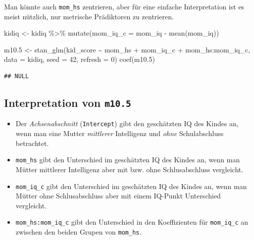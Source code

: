 \documentclass[
  a4paper,
  DIV=11]{scrreprt}
\newenvironment{Shaded}{\begin{snugshade}}{\end{snugshade}}
\newcommand{\AttributeTok}[1]{\textcolor[rgb]{0.40,0.45,0.13}{#1}}
\newcommand{\DecValTok}[1]{\textcolor[rgb]{0.68,0.00,0.00}{#1}}
\newcommand{\FloatTok}[1]{\textcolor[rgb]{0.68,0.00,0.00}{#1}}
\newcommand{\FunctionTok}[1]{\textcolor[rgb]{0.28,0.35,0.67}{#1}}
\newcommand{\NormalTok}[1]{\textcolor[rgb]{0.00,0.23,0.31}{#1}}
\newcommand{\OtherTok}[1]{\textcolor[rgb]{0.00,0.23,0.31}{#1}}
\newcommand{\SpecialCharTok}[1]{\textcolor[rgb]{0.37,0.37,0.37}{#1}}
\providecommand{\tightlist}{%
  \setlength{\itemsep}{0pt}\setlength{\parskip}{0pt}}\usepackage{longtable,booktabs,array}
\theoremstyle{definition}
\theoremstyle{remark}
\begin{document}
Man könnte auch \texttt{mom\_hs} zentrieren, aber für eine einfache
Interpretation ist es meist nützlich, nur metrische Prädiktoren zu
zentrieren.

\begin{Shaded}
\begin{Highlighting}[]
\NormalTok{kidiq }\OtherTok{\textless{}{-}}
\NormalTok{  kidiq }\SpecialCharTok{\%\textgreater{}\%} 
  \FunctionTok{mutate}\NormalTok{(}\AttributeTok{mom\_iq\_c =}\NormalTok{ mom\_iq }\SpecialCharTok{{-}} \FunctionTok{mean}\NormalTok{(mom\_iq))}

\NormalTok{m10}\FloatTok{.5} \OtherTok{\textless{}{-}} \FunctionTok{stan\_glm}\NormalTok{(kid\_score }\SpecialCharTok{\textasciitilde{}}\NormalTok{ mom\_hs }\SpecialCharTok{+}\NormalTok{ mom\_iq\_c }\SpecialCharTok{+}\NormalTok{ mom\_hs}\SpecialCharTok{:}\NormalTok{mom\_iq\_c, }
                  \AttributeTok{data =}\NormalTok{ kidiq, }
                  \AttributeTok{seed =} \DecValTok{42}\NormalTok{,}
                  \AttributeTok{refresh =} \DecValTok{0}\NormalTok{)}
\FunctionTok{coef}\NormalTok{(m10}\FloatTok{.5}\NormalTok{)}
\end{Highlighting}
\end{Shaded}

\begin{verbatim}
## NULL
\end{verbatim}

\hypertarget{interpretation-von-m10.5}{%
\subsection{\texorpdfstring{Interpretation von
\texttt{m10.5}}{Interpretation von m10.5}}\label{interpretation-von-m10.5}}

\begin{itemize}
\tightlist
\item
  Der \emph{Achsenabschnitt} (\texttt{Intercept}) gibt den geschätzten
  IQ des Kindes an, wenn man eine Mutter \emph{mittlerer} Intelligenz
  und \emph{ohne} Schulabschluss betrachtet.
\item
  \texttt{mom\_hs} gibt den Unterschied im geschätzten IQ des Kindes an,
  wenn man Mütter mittlerer Intelligenz aber mit bzw. ohne
  Schlusabschluss vergleicht.
\item
  \texttt{mom\_iq\_c} gibt den Unterschied im geschätzten IQ des Kindes
  an, wenn man Mütter ohne Schlusabschluss aber mit einem IQ-Punkt
  Unterschied vergleicht.
\item
  \texttt{mom\_hs:mom\_iq\_c} gibt den Unterschied in den Koeffizienten
  für \texttt{mom\_iq\_c} an zwischen den beiden Grupen von
  \texttt{mom\_hs}.
\end{itemize}
\end{document}
